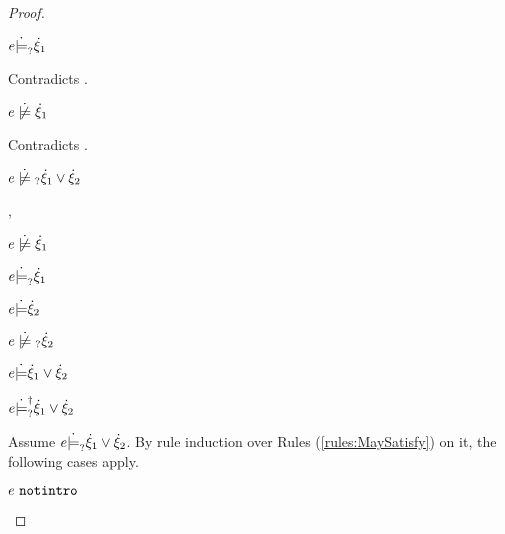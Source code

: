 \begin{proof}
\begin{byCases}
\begin{byCases}
\begin{byCases}
        \item[\text{(\ref{rule:CMSOr1})}]
            \begin{pfsteps*}
            \item $e \dot{\models}_{?} \dot{\xi}_1$ 
            \end{pfsteps*}
            Contradicts .
        \item[\text{(\ref{rule:CMSOr2})}]
            \begin{pfsteps*}
            \item $\cnotsatisfy{e}{\hxi_1}$ 
            \end{pfsteps*}
            Contradicts .
        \end{byCases}
        \begin{pfsteps*}
        \item $\cnotmaysatisfy{e}{\cor{\hxi_1}{\hxi_2}}$ 
        \end{pfsteps*}
    \item[\cmaysatisfy{e}{\hxi_1},\csatisfy{e}{\hxi_2}]
        \begin{pfsteps*}
        \item $\cnotsatisfy{e}{\hxi_1}$  
        \item $e \dot{\models}_{?} \dot{\xi}_1$  
        \item $e \dot{\models} \dot{\xi}_2$  
        \item $\cnotmaysatisfy{e}{\hxi_2}$  
        \item $e \dot{\models} \dot{\xi}_1 \vee \dot{\xi}_2$  
        \item $e \dot{\models}_{?}^{\dag} \dot{\xi}_1 \vee \dot{\xi}_2$ 
        \end{pfsteps*}
        Assume $e \dot{\models}_{?} \dot{\xi}_1 \vee \dot{\xi}_2$. By rule induction over Rules (\ref{rules:MaySatisfy}) on it, the following cases apply.
        \begin{byCases}
        \item[\text{(\ref{rule:CMSNotIntro})}]
            \begin{pfsteps*}
            \item $e ~\mathtt{notintro}$  

\end{pfsteps*}
\end{byCases}
\end{byCases}
\end{byCases}
\end{proof}
